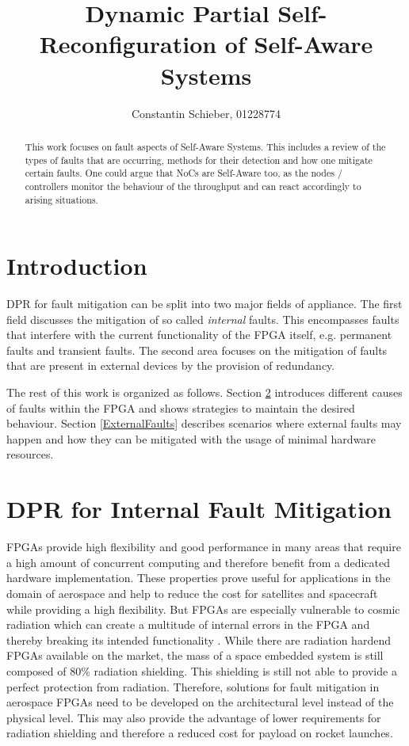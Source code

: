 \documentclass[10pt, journal]{IEEEtran}
\title{Dynamic Partial Self-Reconfiguration of Self-Aware Systems}
\author{Constantin Schieber, 01228774}
\begin{document}
\maketitle

\begin{abstract}
    This work focuses on fault aspects of Self-Aware Systems.
    This includes a review of the types of faults that are occurring, methods for their detection and how one mitigate certain faults. 
    One could argue that \glspl{NoC} are Self-Aware too, as the nodes / controllers monitor the behaviour of the throughput and can react accordingly to arising situations.
\end{abstract}

\section{Introduction}
\gls{DPR} for fault mitigation can be split into two major fields of appliance. 
The first field discusses the mitigation of so called \textit{internal} faults.
This encompasses faults that interfere with the current functionality of the \gls{FPGA} itself, e.g. permanent faults and transient faults.
The second area focuses on the mitigation of faults that are present in external devices by the provision of redundancy.

The rest of this work is organized as follows.
Section \ref{InternalFaults} introduces different causes of faults within the \gls{FPGA} and shows strategies to maintain the desired behaviour.
Section \ref{ExternalFaults} describes scenarios where external faults may happen and how they can be mitigated with the usage of minimal hardware resources. 

\section{\gls{DPR} for Internal Fault Mitigation}\label{InternalFaults}
\glspl{FPGA} provide high flexibility and good performance in many areas that require a high amount of concurrent computing and therefore benefit from a dedicated hardware implementation.
These properties prove useful for applications in the domain of aerospace and help to reduce the cost for satellites and spacecraft while providing a high flexibility. 
But \glspl{FPGA} are especially vulnerable to cosmic radiation which can create a multitude of internal errors in the \gls{FPGA} and thereby breaking its intended functionality \cite{ito_total_2015}.
While there are radiation hardend \glspl{FPGA} available on the market, the mass of a space embedded system is still composed of 80\% radiation shielding.
This shielding is still not able to provide a perfect protection from radiation.
Therefore, solutions for fault mitigation in aerospace \glspl{FPGA} need to be developed on the architectural level instead of the physical level. 
This may also provide the advantage of lower requirements for radiation shielding and therefore a reduced cost for payload on rocket launches.
\end{document}
